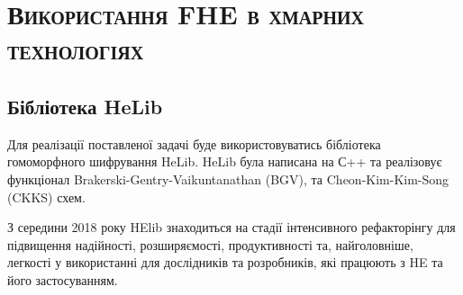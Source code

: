 \newpage

\chapter{\textsc{Використання FHE в хмарних технологіях}}

\section{Бібліотека HeLib}
Для реалізації поставленої задачі буде використовуватись бібліотека гомоморфного шифрування
HeLib. HeLib була написана на С++ та реалізовує функціонал  Brakerski-Gentry-Vaikuntanathan 
(BGV), та Cheon-Kim-Kim-Song (CKKS) схем.

З середини 2018 року HElib знаходиться на стадії інтенсивного рефакторінгу для підвищення
надійності, розширяємості, продуктивності та, найголовніше, легкості у використанні для дослідників та розробників, які працюють з HE та його застосуванням.


